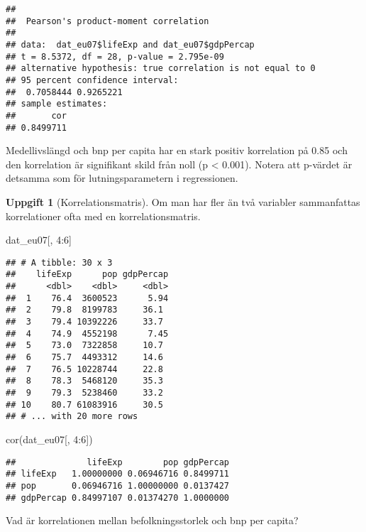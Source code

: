 \documentclass[
]{book}
\newenvironment{Shaded}{\begin{snugshade}}{\end{snugshade}}
\newcommand{\DecValTok}[1]{\textcolor[rgb]{0.00,0.00,0.81}{#1}}
\newcommand{\FunctionTok}[1]{\textcolor[rgb]{0.00,0.00,0.00}{#1}}
\newcommand{\NormalTok}[1]{#1}
\newcommand{\SpecialCharTok}[1]{\textcolor[rgb]{0.00,0.00,0.00}{#1}}
\theoremstyle{definition}
\theoremstyle{definition}
\theoremstyle{definition}
\newtheorem{exercise}{Uppgift}[chapter]
\theoremstyle{definition}
\theoremstyle{remark}
\begin{document}
\begin{Shaded}
\end{Shaded}

\begin{verbatim}
## 
##  Pearson's product-moment correlation
## 
## data:  dat_eu07$lifeExp and dat_eu07$gdpPercap
## t = 8.5372, df = 28, p-value = 2.795e-09
## alternative hypothesis: true correlation is not equal to 0
## 95 percent confidence interval:
##  0.7058444 0.9265221
## sample estimates:
##       cor 
## 0.8499711
\end{verbatim}

Medellivslängd och bnp per capita har en stark positiv korrelation på 0.85 och den korrelation är signifikant skild från noll (p \textless{} 0.001). Notera att p-värdet är detsamma som för lutningsparametern i regressionen.

\begin{exercise}[Korrelationsmatris]
Om man har fler än två variabler sammanfattas korrelationer ofta med en korrelationsmatris.

\begin{Shaded}
\begin{Highlighting}[]
\NormalTok{dat\_eu07[, }\DecValTok{4}\SpecialCharTok{:}\DecValTok{6}\NormalTok{]}
\end{Highlighting}
\end{Shaded}

\begin{verbatim}
## # A tibble: 30 x 3
##    lifeExp      pop gdpPercap
##      <dbl>    <dbl>     <dbl>
##  1    76.4  3600523      5.94
##  2    79.8  8199783     36.1 
##  3    79.4 10392226     33.7 
##  4    74.9  4552198      7.45
##  5    73.0  7322858     10.7 
##  6    75.7  4493312     14.6 
##  7    76.5 10228744     22.8 
##  8    78.3  5468120     35.3 
##  9    79.3  5238460     33.2 
## 10    80.7 61083916     30.5 
## # ... with 20 more rows
\end{verbatim}

\begin{Shaded}
\begin{Highlighting}[]
\FunctionTok{cor}\NormalTok{(dat\_eu07[, }\DecValTok{4}\SpecialCharTok{:}\DecValTok{6}\NormalTok{])}
\end{Highlighting}
\end{Shaded}

\begin{verbatim}
##              lifeExp        pop gdpPercap
## lifeExp   1.00000000 0.06946716 0.8499711
## pop       0.06946716 1.00000000 0.0137427
## gdpPercap 0.84997107 0.01374270 1.0000000
\end{verbatim}

Vad är korrelationen mellan befolkningsstorlek och bnp per capita?
\end{exercise}
\end{document}

